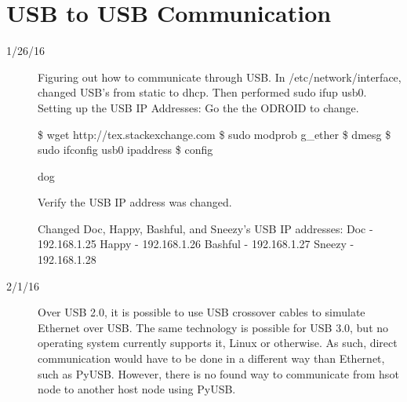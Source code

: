 \section{USB to USB Communication}
\begin{description}
\item [1/26/16] Figuring out how to communicate through USB. In /etc/network/interface, changed USB's from static to dhcp. Then performed sudo ifup usb0.
Setting up the USB IP Addresses:
Go the the ODROID to change.


 	\$ wget http://tex.stackexchange.com
	\$ sudo modprob g_ether
	\$ dmesg
	\$ sudo ifconfig usb0 ipaddress 
	\$ config

\langle dog \rangle

Verify the USB IP address was changed.

Changed Doc, Happy, Bashful, and Sneezy's USB IP addresses:
Doc - 192.168.1.25
Happy - 192.168.1.26
Bashful - 192.168.1.27
Sneezy - 192.168.1.28

\item[2/1/16] Over USB 2.0, it is possible to use USB crossover cables to simulate Ethernet over USB. The same technology is possible for USB 3.0, but no operating system currently supports it, Linux or otherwise. As such, direct communication would have to be done in a different way than Ethernet, such as PyUSB. However, there is no found way to communicate from hsot node to another host node using PyUSB.
\end{description}